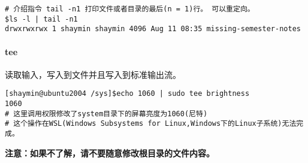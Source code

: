 \documentclass[
]{article}
\begin{document}
\begin{verbatim}
# 介绍指令 tail -n1 打印文件或者目录的最后(n = 1)行。 可以重定向。
$ls -l | tail -n1
drwxrwxrwx 1 shaymin shaymin 4096 Aug 11 08:35 missing-semester-notes
\end{verbatim}

\hypertarget{tee}{%
\paragraph{tee}\label{tee}}

读取输入，写入到文件并且写入到标准输出流。

\begin{verbatim}
[shaymin@ubuntu2004 /sys]$echo 1060 | sudo tee brightness
1060
# 这里调用权限修改了system目录下的屏幕亮度为1060(尼特)
# 这个操作在WSL(Windows Subsystems for Linux,Windows下的Linux子系统)无法完成。
\end{verbatim}

\textbf{注意：如果不了解，请不要随意修改根目录的文件内容。}
\end{document}
